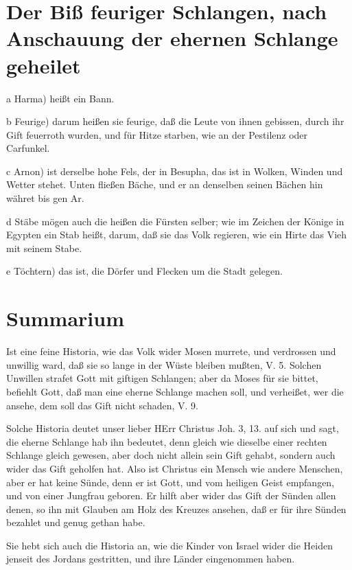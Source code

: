 \section[Der Biß feuriger Schlangen, nach Anschauung der ehernen]{Der Biß feuriger Schlangen, nach Anschauung der ehernen Schlange geheilet}

a Harma) heißt ein Bann.

b Feurige) darum heißen sie feurige, daß die Leute von ihnen gebissen, durch ihr Gift feuerroth wurden, und für Hitze starben, wie an der Pestilenz oder Carfunkel.

c Arnon) ist derselbe hohe Fels, der in Besupha, das ist in Wolken, Winden und Wetter stehet. Unten fließen Bäche, und er an denselben seinen Bächen hin währet bis gen Ar.

d Stäbe mögen auch die heißen die Fürsten selber; wie im Zeichen der Könige in Egypten ein Stab heißt, darum, daß sie das Volk regieren, wie ein Hirte das Vieh mit seinem Stabe.

e Töchtern) das ist, die Dörfer und Flecken um die Stadt gelegen.

\section{Summarium}

Ist eine feine Historia, wie das Volk wider Mosen murrete, und verdrossen und unwillig ward, daß sie so lange in der Wüste bleiben mußten, V. 5. Solchen Unwillen strafet Gott mit giftigen Schlangen; aber da Moses für sie bittet, befiehlt Gott, daß man eine eherne Schlange machen soll, und verheißet, wer die ansehe, dem soll das Gift nicht schaden, V. 9.

Solche Historia deutet unser lieber HErr Christus Joh. 3, 13. auf sich und sagt, die eherne Schlange hab ihn bedeutet, denn gleich wie dieselbe einer rechten Schlange gleich gewesen, aber doch nicht allein sein Gift gehabt, sondern auch wider das Gift geholfen hat. Also ist Christus ein Mensch wie andere Menschen, aber er hat keine Sünde, denn er ist Gott, und vom heiligen
Geist empfangen, und von einer Jungfrau geboren. Er hilft aber wider das Gift der Sünden allen denen, so ihn mit Glauben am Holz des Kreuzes ansehen, daß er für ihre Sünden bezahlet und genug gethan habe.

Sie hebt sich auch die Historia an, wie die Kinder von Israel wider die Heiden jenseit des Jordans gestritten, und ihre Länder eingenommen haben.


